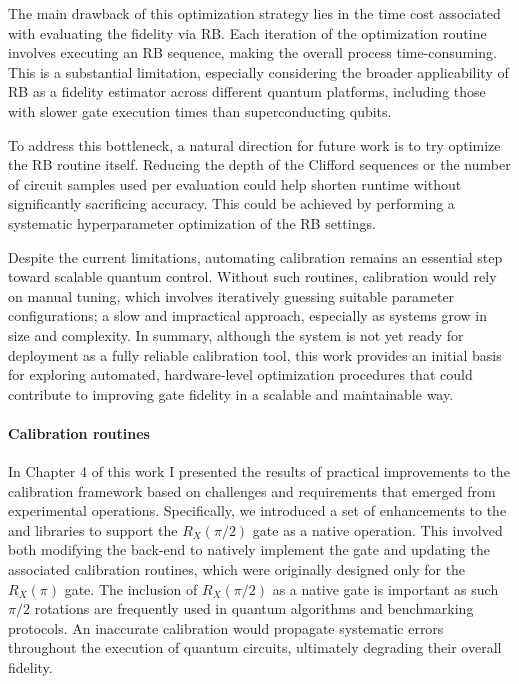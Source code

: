 The main drawback of this optimization strategy lies in the time cost associated with evaluating the fidelity via RB. 
Each iteration of the optimization routine involves executing an RB sequence, making the overall process time-consuming. 
This is a substantial limitation, especially considering the broader applicability of RB as a fidelity estimator across different quantum platforms, including those with slower gate execution times than superconducting qubits.

To address this bottleneck, a natural direction for future work is to try optimize the RB routine itself. 
Reducing the depth of the Clifford sequences or the number of circuit samples used per evaluation could help shorten runtime without significantly sacrificing accuracy. 
This could be achieved by performing a systematic hyperparameter optimization of the RB settings. 

Despite the current limitations, automating calibration remains an essential step toward scalable quantum control. 
Without such routines, calibration would rely on manual tuning, which involves iteratively guessing suitable parameter configurations; a slow and impractical approach, especially as systems grow in size and complexity. 
In summary, although the system is not yet ready for deployment as a fully reliable calibration tool, this work provides an initial basis for exploring automated, hardware-level optimization procedures that could contribute to improving gate fidelity in a scalable and maintainable way.


\paragraph{Calibration routines}
In Chapter 4 of this work I presented the results of practical improvements to the calibration framework based on challenges and requirements that emerged from experimental operations. 
Specifically, we introduced a set of enhancements to the \Qibolab and \Qibocal libraries to support the $R_X(\pi/2)$ gate as a native operation. 
This involved both modifying the back-end to natively implement the gate and updating the associated calibration routines, which were originally designed only for the $R_X(\pi)$ gate.
The inclusion of $R_X(\pi/2)$ as a native gate is important as such $\pi/2$ rotations are frequently used in quantum algorithms and benchmarking protocols. 
An inaccurate calibration would propagate systematic errors throughout the execution of quantum circuits, ultimately degrading their overall fidelity.

